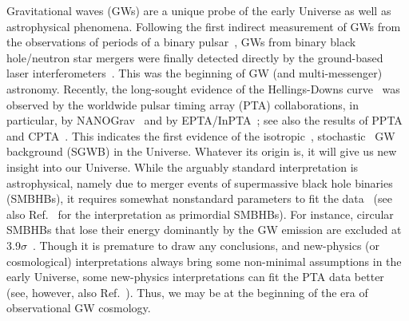 \documentclass[superscriptaddress, aps, preprintnumbers,
amsmath, amssymb, sort&compress, nofootinbib, 10pt, paper, floatfix]{revtex4-2}
\begin{document}
Gravitational waves (GWs) are a unique probe of the early Universe as well as astrophysical phenomena.  Following the first indirect measurement of GWs from the observations of periods of a binary pulsar~\cite{Taylor:1979zz}, GWs from binary black hole/neutron star mergers were finally detected directly by the ground-based laser interferometers~\cite{Abbott:2016blz, LIGOScientific:2021djp}. This was the beginning of GW (and multi-messenger) astronomy. Recently, the long-sought evidence of the Hellings-Downs curve~\cite{Hellings:1983fr} was observed by the worldwide pulsar timing array (PTA) collaborations, in particular, by NANOGrav~\cite{NANOGrav:2023gor, NANOGrav:2023hde, NANOGrav:2023hvm} and by EPTA/InPTA~\cite{Antoniadis:2023rey, Antoniadis:2023utw, Antoniadis:2023zhi}; see also the results of PPTA~\cite{Reardon:2023gzh, Zic:2023gta, Reardon:2023zen} and CPTA~\cite{Xu:2023wog}.  This indicates the first evidence of the isotropic~\cite{NANOGrav:2023tcn}, stochastic~\cite{NANOGrav:2023pdq, Antoniadis:2023bjw} GW background (SGWB) in the Universe.  Whatever its origin is, it will give us new insight into our Universe. While the arguably standard interpretation is astrophysical, namely due to merger events of supermassive black hole binaries (SMBHBs), it requires somewhat nonstandard parameters to fit the data~\cite{NANOGrav:2023hfp, Antoniadis:2023zhi, Ellis:2023dgf} (see also Ref.~\cite{Depta:2023qst} for the interpretation as primordial SMBHBs). For instance, circular SMBHBs that lose their energy dominantly by the GW emission are excluded at 3.9$\sigma$~\cite{Figueroa:2023zhu}.  Though it is premature to draw any conclusions, and new-physics (or cosmological) interpretations always bring some non-minimal assumptions in the early Universe, some new-physics interpretations can fit the PTA data better~\cite{NANOGrav:2023hvm, Figueroa:2023zhu, Ellis:2023oxs} (see, however, also Ref.~\cite{Bian:2023dnv}).  Thus, we may be at the beginning of the era of observational GW cosmology.
\end{document}

